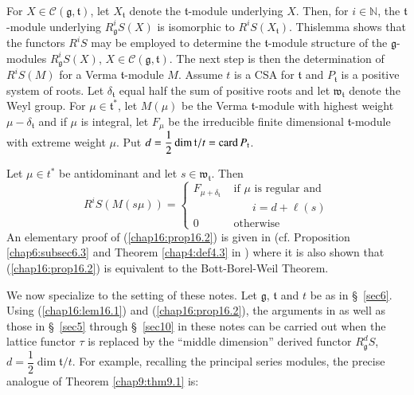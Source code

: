 \begin{lemma}\label{chap16:lem16.1}
For $X \in \mathcal{C} (\mathfrak{g}, \mathfrak{t})$, let
$X_\mathfrak{t}$ denote the $\mathfrak{t}$-module underlying
$X$. Then, for $i \in \mathbb{N}$, the $\mathfrak{t}$-module
underlying $R^i_\mathfrak{g} S(X)$ is isomorphic to $R^i
S(X_\mathfrak{t})$.  This\pageoriginale lemma shows that the functors
$R^iS$ may be employed to determine the $\mathfrak{t}$-module
structure of the $\mathfrak{g}$-modules $R^i_\mathfrak{g} S(X)$, $X
\in \mathcal{C} (\mathfrak{g}, \mathfrak{t})$. The next step is then
the determination of $R^i S(M)$ for a Verma $\mathfrak{t}$-module
$M$. Assume $t$ is a CSA for $\mathfrak{t}$ and $P_\mathfrak{t}$ is a
positive system of roots. Let $\delta_\mathfrak{t}$ equal half the sum
of positive roots and let $\mathfrak{w}_\mathfrak{t}$ denote the Weyl
group. For $\mu \in \mathfrak{t}^*$, let $M(\mu)$ be the Verma
$\mathfrak{t}$-module with highest weight $\mu - \delta_\mathfrak{t}$
and if $\mu$ is integral, let $F_\mu$ be the irreducible finite
dimensional $\mathfrak{t}$-module with extreme weight $\mu$. Put $d =
\dfrac{1}{2} \dim \mathfrak{t}/t = \operatorname{card} P_\mathfrak{t}$. 
\end{lemma}

\begin{prop}\label{chap16:prop16.2}
Let $\mu \in t^*$ be antidominant and let $s \in
\mathfrak{w}_\mathfrak{t}$. Then 
$$
R^i S (M(s\mu)) = 
\begin{cases}
F_{\mu + \delta_\mathfrak{t}} & \text{ if $\mu$ is regular and }\\
&  \qquad i = d + \ell (s)\\
0 & \text{ otherwise}
\end{cases}
$$
An elementary proof of (\ref{chap16:prop16.2}) is given in \cite{key19}
(cf. Proposition \ref{chap6:subsec6.3} and Theorem \ref{chap4:def4.3}
in \cite{key19}) where it is also 
shown that (\ref{chap16:prop16.2}) is equivalent to the Bott-Borel-Weil Theorem. 
\end{prop}

We now specialize to the setting of these notes. Let $\mathfrak{g}$,
$\mathfrak{t}$ and $t$ be as in \S\ \ref{sec6}. Using (\ref{chap16:lem16.1})
and (\ref{chap16:prop16.2}), the 
arguments in \cite{key15} as well as those in \S\ \ref{sec5} through \S\ \ref{sec10} in
these notes can be carried out when the lattice functor $\tau$ is
replaced by the ``middle dimension'' derived functor $R^d_\mathfrak{g}
S$, $d = \dfrac{1}{2}  \dim \mathfrak{t}/ t$. For example, recalling
the principal series modules, the precise analogue of Theorem \ref{chap9:thm9.1} is: 

